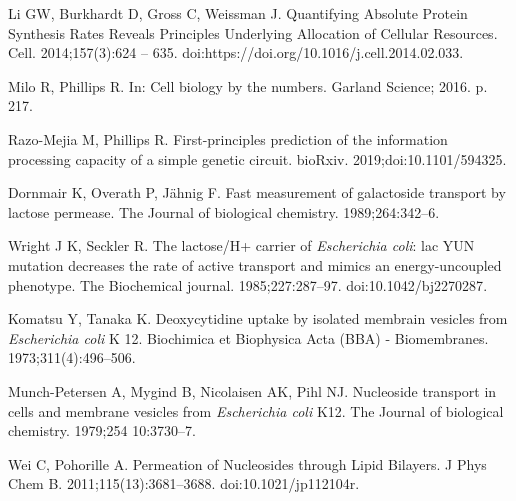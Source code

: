 \documentclass[10pt,letterpaper]{article}
\begin{document}
\begin{thebibliography}{10}
	Li GW, Burkhardt D, Gross C, Weissman J.
	\newblock Quantifying Absolute Protein Synthesis Rates Reveals Principles
	Underlying Allocation of Cellular Resources.
	\newblock Cell. 2014;157(3):624 -- 635.
	\newblock doi:{https://doi.org/10.1016/j.cell.2014.02.033}.
	
	Milo R, Phillips R.
	\newblock In: Cell biology by the numbers. Garland Science; 2016. p. 217.
	
	Razo-Mejia M, Phillips R.
	\newblock First-principles prediction of the information processing capacity of
	a simple genetic circuit.
	\newblock bioRxiv. 2019;doi:{10.1101/594325}.
	
	Dornmair K, Overath P, Jähnig F.
	\newblock Fast measurement of galactoside transport by lactose permease.
	\newblock The Journal of biological chemistry. 1989;264:342--6.
	
	Wright J K, Seckler R.
	\newblock The lactose/H+ carrier of \emph{Escherichia coli}: lac YUN mutation
	decreases the rate of active transport and mimics an energy-uncoupled
	phenotype.
	\newblock The Biochemical journal. 1985;227:287--97.
	\newblock doi:{10.1042/bj2270287}.
	
	Komatsu Y, Tanaka K.
	\newblock Deoxycytidine uptake by isolated membrain vesicles from
	\emph{Escherichia coli} K 12.
	\newblock Biochimica et Biophysica Acta (BBA) - Biomembranes.
	1973;311(4):496--506.
	
	Munch-Petersen A, Mygind B, Nicolaisen AK, Pihl NJ.
	\newblock Nucleoside transport in cells and membrane vesicles from
	\emph{Escherichia coli} K12.
	\newblock The Journal of biological chemistry. 1979;254 10:3730--7.
	
	Wei C, Pohorille A.
	\newblock Permeation of Nucleosides through Lipid Bilayers.
	\newblock J Phys Chem B. 2011;115(13):3681--3688.
	\newblock doi:{10.1021/jp112104r}.
	
\end{thebibliography}
\end{document}
